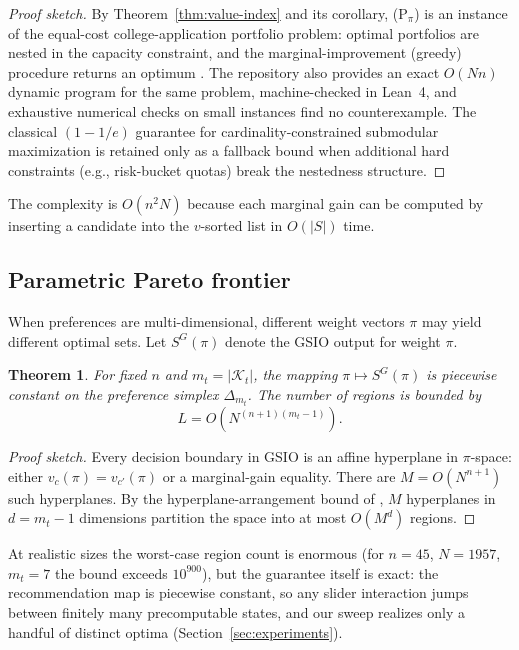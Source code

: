 \documentclass[11pt,a4paper]{article}
\newtheorem{theorem}{Theorem}[section]
\begin{document}
\begin{proof}[Proof sketch]
By Theorem~\ref{thm:value-index} and its corollary, (P$_\pi$) is an instance of the equal-cost college-application portfolio problem: optimal portfolios are nested in the capacity constraint, and the marginal-improvement (greedy) procedure returns an optimum \citep{chade2006simultaneous,kapur2022college}. The repository also provides an exact $O(Nn)$ dynamic program for the same problem, machine-checked in Lean~4, and exhaustive numerical checks on small instances find no counterexample. The classical $(1-1/e)$ guarantee for cardinality-constrained submodular maximization \citep{nemhauser1978analysis} is retained only as a fallback bound when additional hard constraints (e.g., risk-bucket quotas) break the nestedness structure.
\end{proof}

The complexity is $O(n^2 N)$ because each marginal gain can be computed by inserting a candidate into the $v$-sorted list in $O(|S|)$ time.

\subsection{Parametric Pareto frontier}

When preferences are multi-dimensional, different weight vectors $\pi$ may yield different optimal sets. Let $S^G(\pi)$ denote the GSIO output for weight $\pi$.

\begin{theorem}\label{thm:piecewise}
For fixed $n$ and $m_t = |\mathcal{K}_t|$, the mapping $\pi \mapsto S^G(\pi)$ is piecewise constant on the preference simplex $\Delta_{m_t}$. The number of regions is bounded by
\[
L = O\left(N^{(n+1)(m_t-1)}\right).
\]
\end{theorem}

\begin{proof}[Proof sketch]
Every decision boundary in GSIO is an affine hyperplane in $\pi$-space: either $v_c(\pi) = v_{c'}(\pi)$ or a marginal-gain equality. There are $M = O(N^{n+1})$ such hyperplanes. By the hyperplane-arrangement bound of \citet{zaslavski1975facing}, $M$ hyperplanes in $d = m_t - 1$ dimensions partition the space into at most $O(M^d)$ regions.
\end{proof}

At realistic sizes the worst-case region count is enormous (for $n = 45$, $N = 1957$, $m_t = 7$ the bound exceeds $10^{900}$), but the guarantee itself is exact: the recommendation map is piecewise constant, so any slider interaction jumps between finitely many precomputable states, and our sweep realizes only a handful of distinct optima (Section~\ref{sec:experiments}).
\end{document}
